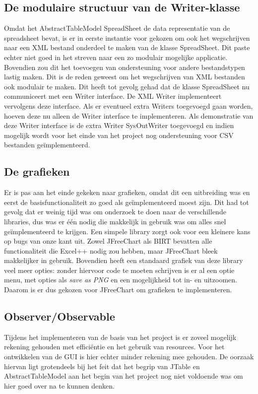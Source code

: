 \documentclass[a4paper,11pt,titlepage]{scrartcl}
\begin{document}
\newpage\subsection{De modulaire structuur van de Writer-klasse}
Omdat het AbstractTableModel SpreadSheet de data representatie van de spreadsheet bevat, is er in eerste instantie voor gekozen om ook het wegschrijven naar een XML bestand onderdeel te maken van de klasse SpreadSheet. Dit paste echter niet goed in het streven naar een zo modulair mogelijke applicatie. Bovendien zou dit het toevoegen van ondersteuning voor andere bestandstypen lastig maken. Dit is de reden geweest om het wegschrijven van XML bestanden ook modulair te maken. Dit heeft tot gevolg gehad dat de klasse SpreadSheet nu communiceert met een Writer interface. De XML Writer implementeert vervolgens deze interface. Als er eventueel extra Writers toegevoegd gaan worden, hoeven deze nu alleen de Writer interface te implementeren. Als demonstratie van deze Writer interface is de extra Writer SysOutWriter toegevoegd en indien mogelijk wordt voor het einde van het project nog ondersteuning voor CSV bestanden geïmplementeerd.

\subsection{De grafieken}
Er is pas aan het einde gekeken naar grafieken, omdat dit een uitbreiding was en eerst de basisfunctionaliteit zo goed als geïmplementeerd moest zijn. Dit had tot gevolg dat er weinig tijd was om onderzoek te doen naar de verschillende libraries, dus was er één nodig die makkelijk in gebruik was om alles snel geïmplementeerd te krijgen. Een simpele library zorgt ook voor een kleinere kans op bugs van onze kant uit. Zowel JFreeChart als BIRT bevatten alle functionaliteit die Excel++ nodig zou hebben, maar JFreeChart bleek makkelijker in gebruik. Bovendien heeft een standaard grafiek van deze library veel meer opties: zonder hiervoor code te moeten schrijven is er al een optie menu, met opties als \textit{save as PNG} en een mogelijkheid tot in- en uitzoomen. Daarom is er dus gekozen voor JFreeChart om grafieken te implementeren.

\subsection{Observer/Observable}
Tijdens het implementeren van de basis van het project is er zoveel mogelijk rekening gehouden met efficiëntie en het gebruik van resources. Voor het ontwikkelen van de GUI is hier echter minder rekening mee gehouden. De oorzaak hiervan ligt grotendeels bij het feit dat het begrip van JTable en AbstractTableModel aan het begin van het project nog niet voldoende was om hier goed over na te kunnen denken.\\
\end{document}
